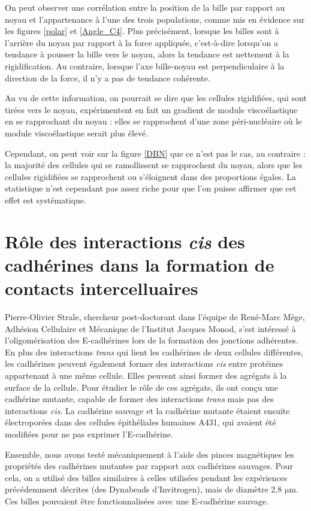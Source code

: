 \documentclass{report}
\newcommand{\micro}{$\mathrm{\mu}$}
\begin{document}
On peut observer une corrélation entre la position de la bille par rapport au noyau et l'appartenance à l'une des trois populations, comme mis en évidence sur les figures \ref{polar} et \ref{Angle_C4}. 
Plus précisément, lorsque les billes sont \og à l'arrière du noyau \fg par rapport à la force appliquée, c'est-à-dire lorsqu'on a tendance à pousser la bille vers le noyau, alors la tendance est nettement à la rigidification. Au contraire, lorsque l'axe bille-noyau est perpendiculaire à la direction de la force, il n'y a pas de tendance cohérente. 

Au vu de cette information, on pourrait se dire que les cellules rigidifiées, qui sont tirées vers le noyau, expérimentent en fait un gradient de module viscoélastique en se rapprochant du noyau : elles se rapprochent d'une zone péri-nucléaire où le module viscoélastique serait plus élevé. 

Cependant, on peut voir sur la figure \ref{DBN} que ce n'est pas le cas, au contraire : la majorité des cellules qui se ramollissent se rapprochent du noyau, alors que les cellules rigidifiées se rapprochent ou s'éloignent dans des proportions égales. La statistique n'est cependant pas assez riche pour que l'on puisse affirmer que cet effet est systématique.

 
 \section{Rôle des interactions \textit{cis} des cadhérines dans la formation de contacts intercelluaires}
 
 Pierre-Olivier Strale, chercheur post-doctorant dans l'équipe de René-Marc Mège, Adhésion Cellulaire et Mécanique de l'Institut Jacques Monod, s'est intéressé à l'oligomérisation des E-cadhérines lors de la formation des jonctions adhérentes. En plus des interactions \textit{trans} qui lient les cadhérines de deux cellules différentes, les cadhérines peuvent également former des interactions \textit{cis} entre protéines appartenant à une même cellule. Elles peuvent ainsi former des agrégats à la surface de la cellule. Pour étudier le rôle de ces agrégats, ils ont conçu une cadhérine mutante, capable de former des interactions \textit{trans} mais pas des interactions \textit{cis}. La cadhérine sauvage et la cadhérine mutante étaient ensuite électroporées dans des cellules épithéliales humaines A431, qui avaient été modifiées pour ne pas exprimer l'E-cadhérine.  
 
 Ensemble, nous avons testé mécaniquement à l'aide des pinces magnétiques les propriétés des cadhérines mutantes par rapport aux cadhérines sauvages. Pour cela, on a utilisé des billes similaires à celles utilisées pendant les expériences précédemment décrites (des Dynabeads d'Invitrogen), mais de diamètre 2,8 \micro m. Ces billes pouvaient être fonctionnalisées avec une E-cadhérine sauvage. 
 
\end{document}
